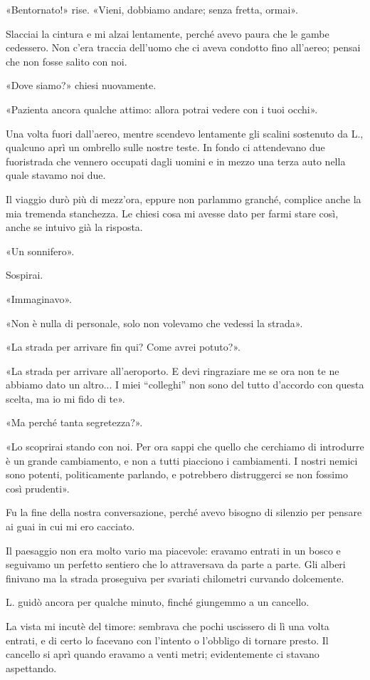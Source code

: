 \documentclass[a4paper,11pt,oneside,openright,final]{memoir}
\begin{document}
«Bentornato!» rise. «Vieni, dobbiamo andare; senza fretta, ormai».

Slacciai la cintura e mi alzai lentamente, perché avevo paura che le gambe
cedessero. Non c'era traccia dell'uomo che ci aveva condotto fino all'aereo;
pensai che non fosse salito con noi.

«Dove siamo?» chiesi nuovamente.

«Pazienta ancora qualche attimo: allora potrai vedere con i tuoi occhi».

Una volta fuori dall'aereo, mentre scendevo lentamente gli scalini sostenuto
da L., qualcuno aprì un ombrello sulle nostre teste. In fondo ci attendevano due
fuoristrada che vennero occupati dagli uomini e in mezzo una terza auto nella
quale stavamo noi due.

Il viaggio durò più di mezz'ora, eppure non parlammo granché, complice anche la
mia tremenda stanchezza. Le chiesi cosa mi avesse dato per farmi stare così,
anche se intuivo già la risposta.

«Un sonnifero».

Sospirai.

«Immaginavo».

«Non è nulla di personale, solo non volevamo che vedessi la strada».

«La strada per arrivare fin qui? Come avrei potuto?».

«La strada per arrivare all'aeroporto. E devi ringraziare me se ora non te ne
abbiamo dato un altro... I miei ``colleghi'' non sono del tutto d'accordo con
questa scelta, ma io mi fido di te».

«Ma perché tanta segretezza?».

«Lo scoprirai stando con noi. Per ora sappi che quello che cerchiamo di
introdurre è un grande cambiamento, e non a tutti piacciono i cambiamenti. I
nostri nemici sono potenti, politicamente parlando, e potrebbero distruggerci se
non fossimo così prudenti».

Fu la fine della nostra conversazione, perché avevo bisogno di silenzio per
pensare ai guai in cui mi ero cacciato.

Il paesaggio non era molto vario ma piacevole: eravamo entrati in un bosco e
seguivamo un perfetto sentiero che lo attraversava da parte a parte. Gli alberi
finivano ma la strada proseguiva per svariati chilometri curvando dolcemente.

L. guidò ancora per qualche minuto, finché giungemmo a un cancello.

La vista mi incutè del timore: sembrava che pochi uscissero di lì una volta
entrati, e di certo lo facevano con l'intento o l'obbligo di tornare presto. Il
cancello si aprì quando eravamo a venti metri; evidentemente ci stavano
aspettando.
\end{document}
